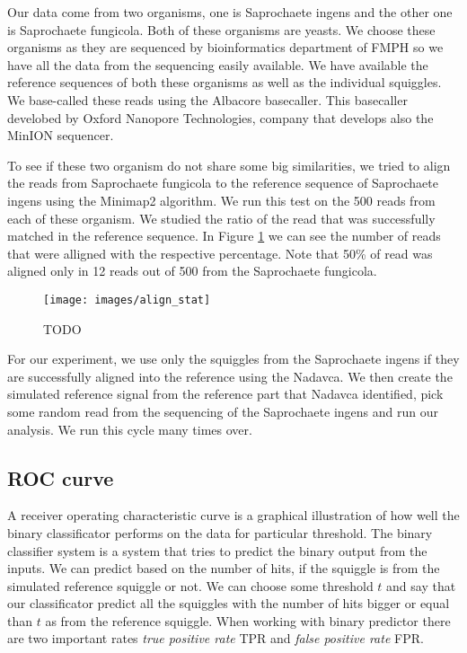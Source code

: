 Our data come from two organisms, one is Saprochaete ingens and the other one is
Saprochaete fungicola. Both of these organisms are yeasts. We choose these
organisms as they are sequenced by bioinformatics department of
FMPH so we have all the data from the sequencing easily available.
We have available the reference sequences of both these organisms as well as the
individual squiggles. We base-called these reads using the Albacore basecaller.
This basecaller develobed by Oxford Nanopore Technologies, company that develops also the MinION sequencer.

To see if these two organism do not share some big similarities, we tried to align the reads from
Saprochaete fungicola to the reference sequence of Saprochaete ingens using the Minimap2
algorithm. We run this test on the 500 reads from each of these organism. We studied
the ratio of the read that was successfully matched in the reference sequence. In Figure \ref{obr:align_stat}
we can see the number of reads that were alligned with the respective percentage.
Note that 50\% of read was aligned only in 12 reads out of 500 from the Saprochaete fungicola.

\begin{figure}
\centerline{\texttt{[image: images/align\_stat]}}
\caption[TODO]{TODO}
\label{obr:align_stat}
\end{figure}

For our experiment, we use only the squiggles from the Saprochaete ingens if they
are successfully aligned into the reference using the Nadavca. We then create the
simulated reference signal from the reference part that Nadavca identified, pick
some random read from the sequencing of the Saprochaete ingens and run our analysis.
We run this cycle many times over.

\subsection{ROC curve}

A receiver operating characteristic curve is a graphical illustration of how well
the binary classificator performs on the data for particular threshold. The binary
classifier system is a system that tries to predict the binary output from the inputs.
We can predict based on the number of hits, if the squiggle is from the
simulated reference squiggle or not. We can choose some threshold $t$ and say that
our classificator predict all the squiggles with the number of hits bigger or equal
than $t$ as from the reference squiggle. When working with binary predictor there
are two important rates \textit{true positive rate} TPR and \textit{false positive rate} FPR. 

